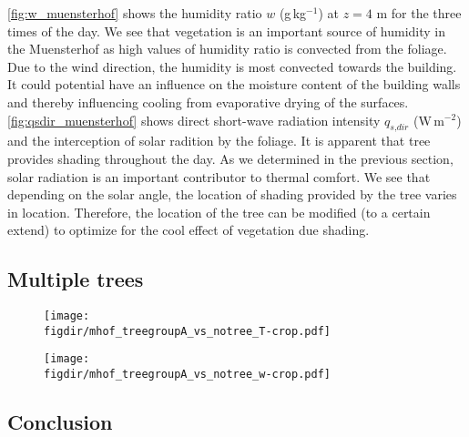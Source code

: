 \cref{fig:w_muensterhof} shows the humidity ratio  $w$ (g\,kg$^{-1}$) at $z=4$ m for the three times of the day. We see that vegetation is an important source of humidity in the Muensterhof as high values of humidity ratio is convected from the foliage. Due to the wind direction, the humidity is most convected towards the building. It could potential have an influence on the moisture content of the building walls and thereby influencing cooling from evaporative drying of the surfaces. \cref{fig:qsdir_muensterhof} shows direct short-wave radiation intensity $q_{\textit{s,dir}}$ (W\,m$^{-2}$) and the interception of solar radition by the foliage. It is apparent that tree provides shading throughout the day. As we determined in the previous section, solar radiation is an important contributor to thermal comfort. We see that depending on the solar angle, the location of shading provided by the tree varies in location. Therefore, the location of the tree can be modified (to a certain extend) to optimize for the cool effect of vegetation due shading.

\subsection{Multiple trees}

	\begin{figure}[p]
		\centering
		\texttt{[image: \\figdir/mhof\_treegroupA\_vs\_notree\_T-crop.pdf]}
		\caption{}
		\label{fig:mTdiff_muensterhof}
	\end{figure}
	
	\begin{figure}[p]
		\centering
		\texttt{[image: \\figdir/mhof\_treegroupA\_vs\_notree\_w-crop.pdf]}
		\caption{}
		\label{fig:mwdiff_muensterhof}
	\end{figure}

\subsection{Conclusion}

